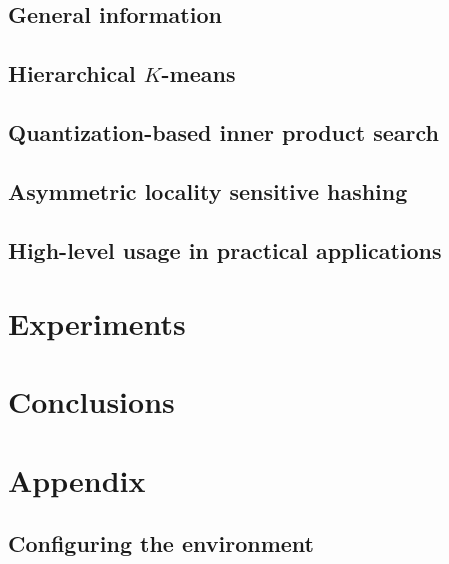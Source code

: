 \documentclass[english,bachelor,a4paper,twoside,11pt]{ppfcmthesis}
\begin{document}
	\section{General information}
	
	\section{Hierarchical $K$-means}
	
	\section{Quantization-based inner product search}
	
	\section{Asymmetric locality sensitive hashing}
	
	\section{High-level usage in practical applications}
	
\chapter{Experiments}
	
	
\chapter{Conclusions}
	


\newpage
\chapter{Appendix}
\section{Configuring the environment}
	

\ppcolophon
\end{document}
